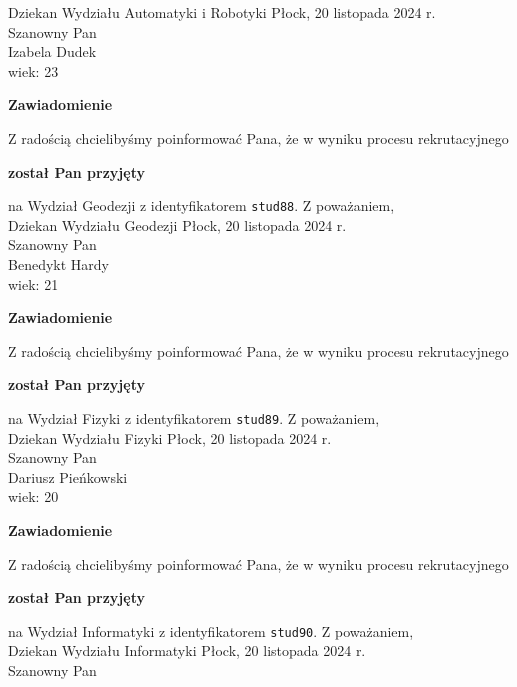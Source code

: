 \documentclass[12pt,a4paper]{article}
\begin{document}
Dziekan
Wydziału Automatyki i Robotyki
\newpage
\hfill Płock, 20 listopada 2024 r.\\
\noindent 
Szanowny Pan \\
Izabela Dudek \\
wiek: 23
\bigskip
\begin{center}
 	{\Large\textbf{Zawiadomienie}}
\end{center}
\bigskip
Z radością chcielibyśmy poinformować Pana, że w wyniku procesu rekrutacyjnego 
\begin{center}
\textsf{\textbf{został Pan przyjęty}} 
\end{center}
na Wydział Geodezji z identyfikatorem \verb|stud88|. 
\vspace{2cm}
\noindent
Z poważaniem,\\
Dziekan
Wydziału Geodezji
\newpage
\hfill Płock, 20 listopada 2024 r.\\
\noindent 
Szanowny Pan \\
Benedykt Hardy \\
wiek: 21
\bigskip
\begin{center}
 	{\Large\textbf{Zawiadomienie}}
\end{center}
\bigskip
Z radością chcielibyśmy poinformować Pana, że w wyniku procesu rekrutacyjnego 
\begin{center}
\textsf{\textbf{został Pan przyjęty}} 
\end{center}
na Wydział Fizyki z identyfikatorem \verb|stud89|. 
\vspace{2cm}
\noindent
Z poważaniem,\\
Dziekan
Wydziału Fizyki
\newpage
\hfill Płock, 20 listopada 2024 r.\\
\noindent 
Szanowny Pan \\
Dariusz Pieńkowski \\
wiek: 20
\bigskip
\begin{center}
 	{\Large\textbf{Zawiadomienie}}
\end{center}
\bigskip
Z radością chcielibyśmy poinformować Pana, że w wyniku procesu rekrutacyjnego 
\begin{center}
\textsf{\textbf{został Pan przyjęty}} 
\end{center}
na Wydział Informatyki z identyfikatorem \verb|stud90|. 
\vspace{2cm}
\noindent
Z poważaniem,\\
Dziekan
Wydziału Informatyki
\newpage
\hfill Płock, 20 listopada 2024 r.\\
\noindent 
Szanowny Pan \\
\end{document}
